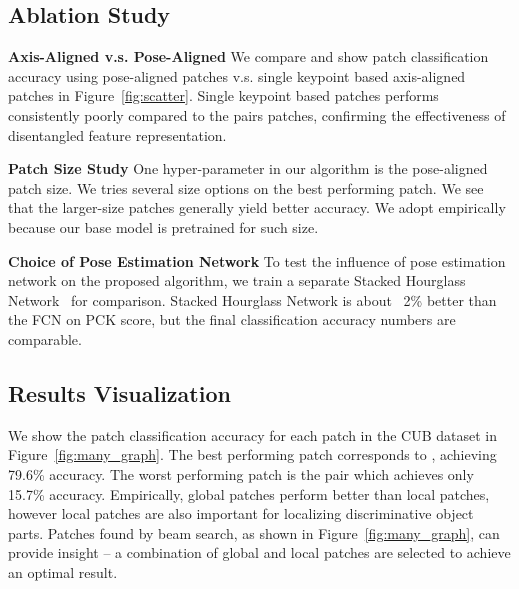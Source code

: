 \subsection{Ablation Study}

\textbf{Axis-Aligned v.s. Pose-Aligned}
We compare and show patch classification accuracy using pose-aligned patches v.s. single keypoint based axis-aligned patches in Figure~\ref{fig:scatter}. Single keypoint based patches performs consistently poorly compared to the pairs patches, confirming the effectiveness of disentangled feature representation.

\textbf{Patch Size Study}
One hyper-parameter in our algorithm is the pose-aligned patch size. We tries several size options on the best performing patch. We see that the larger-size patches generally yield better accuracy. We adopt  empirically because our base model is pretrained for such size.

\textbf{Choice of Pose Estimation Network} To test the influence of pose estimation network on the proposed algorithm, we train a separate Stacked Hourglass Network~\cite{newell2016stacked} for comparison. Stacked Hourglass Network is about ~2\% better than the FCN on PCK score, but the final classification accuracy numbers are comparable.

\subsection{Results Visualization}
\begin{comment}
Given 105 patches on one image, we are interested to know how prediction accuracy is distributed across the patches. 
We show the patch effectiveness histogram in Figure~\ref{fig:patch_classification}. We notice there is one patch does extremely poorly, only achieving 14.3\% accuracy.
This patch corresponds to the \patchpair{left-leg}{right-leg} pair
\end{comment}

We show the patch classification accuracy for each patch in the CUB dataset in Figure~\ref{fig:many_graph}. The best performing patch corresponds to , achieving 79.6\% accuracy. The worst performing patch is the  pair which achieves only  15.7\% accuracy. Empirically, global patches perform better than local patches, however local patches are also important for localizing discriminative object parts. Patches found by beam search, as shown in Figure~\ref{fig:many_graph}, can provide insight -- a combination of global and local patches are selected to achieve an optimal result.




